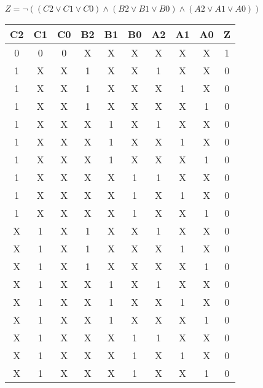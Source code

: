 \begin{center}
    {\(Z = \lnot ((C2 \lor C1 \lor C0) \land (B2 \lor B1 \lor B0) \land (A2 \lor A1 \lor A0)) \)}
    \begin{table}[h] %
        \begin{center}
            \begin{tabular}{|c|c|c|c|c|c|c|c|c||c|} \hline
            C2 & C1 & C0 & B2 & B1 & B0 & A2 & A1 & A0 & Z \\ \hline\hline
            0  & 0  & 0  & X  & X  & X  & X  & X  & X  & 1 \\ \hline
            1  & X  & X  & 1  & X  & X  & 1  & X  & X  & 0 \\ \hline
            1  & X  & X  & 1  & X  & X  & X  & 1  & X  & 0 \\ \hline
            1  & X  & X  & 1  & X  & X  & X  & X  & 1  & 0 \\ \hline
            1  & X  & X  & X  & 1  & X  & 1  & X  & X  & 0 \\ \hline
            1  & X  & X  & X  & 1  & X  & X  & 1  & X  & 0 \\ \hline
            1  & X  & X  & X  & 1  & X  & X  & X  & 1  & 0 \\ \hline
            1  & X  & X  & X  & X  & 1  & 1  & X  & X  & 0 \\ \hline
            1  & X  & X  & X  & X  & 1  & X  & 1  & X  & 0 \\ \hline
            1  & X  & X  & X  & X  & 1  & X  & X  & 1  & 0 \\ \hline
            X  & 1  & X  & 1  & X  & X  & 1  & X  & X  & 0 \\ \hline
            X  & 1  & X  & 1  & X  & X  & X  & 1  & X  & 0 \\ \hline
            X  & 1  & X  & 1  & X  & X  & X  & X  & 1  & 0 \\ \hline
            X  & 1  & X  & X  & 1  & X  & 1  & X  & X  & 0 \\ \hline
            X  & 1  & X  & X  & 1  & X  & X  & 1  & X  & 0 \\ \hline
            X  & 1  & X  & X  & 1  & X  & X  & X  & 1  & 0 \\ \hline
            X  & 1  & X  & X  & X  & 1  & 1  & X  & X  & 0 \\ \hline
            X  & 1  & X  & X  & X  & 1  & X  & 1  & X  & 0 \\ \hline
            X  & 1  & X  & X  & X  & 1  & X  & X  & 1  & 0 \\ \hline

\end{tabular}
\end{center}
\end{table}
\end{center}
